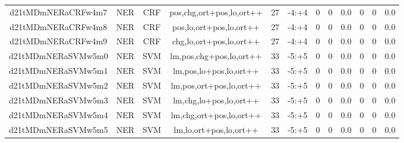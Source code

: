 \documentclass[a4paper]{article}
\begin{document}
\begin{landscape}
\begin{center}
\begin{tabular}{ |c|c|c|c|c|c|c|c|c|c|c|c|}
 
 	
 	\small{ d21tMDmNERaCRFw4m7 } & \small{ NER} & \small{  CRF }  & pos,chg,ort+pos,lo,ort++  &  27 &  \small{  -4:+4 }  &  0 & 0 & 0.0  &  0 & 0 & 0.0 \\
 	

 
 	
 	\small{ d21tMDmNERaCRFw4m8 } & \small{ NER} & \small{  CRF }  & pos,lo,ort+pos,lo,ort++  &  27 &  \small{  -4:+4 }  &  0 & 0 & 0.0  &  0 & 0 & 0.0 \\
 	

 
 	
 	\small{ d21tMDmNERaCRFw4m9 } & \small{ NER} & \small{  CRF }  & chg,lo,ort+pos,lo,ort++  &  27 &  \small{  -4:+4 }  &  0 & 0 & 0.0  &  0 & 0 & 0.0 \\
 	

 
 	
 	\small{ d21tMDmNERaSVMw5m0 } & \small{ NER} & \small{  SVM }  & lm,pos,chg+pos,lo,ort++  &  33 &  \small{  -5:+5 }  &  0 & 0 & 0.0  &  0 & 0 & 0.0 \\
 	

 
 	
 	\small{ d21tMDmNERaSVMw5m1 } & \small{ NER} & \small{  SVM }  & lm,pos,lo+pos,lo,ort++  &  33 &  \small{  -5:+5 }  &  0 & 0 & 0.0  &  0 & 0 & 0.0 \\
 	

 
 	
 	\small{ d21tMDmNERaSVMw5m2 } & \small{ NER} & \small{  SVM }  & lm,pos,ort+pos,lo,ort++  &  33 &  \small{  -5:+5 }  &  0 & 0 & 0.0  &  0 & 0 & 0.0 \\
 	

 
 	
 	\small{ d21tMDmNERaSVMw5m3 } & \small{ NER} & \small{  SVM }  & lm,chg,lo+pos,lo,ort++  &  33 &  \small{  -5:+5 }  &  0 & 0 & 0.0  &  0 & 0 & 0.0 \\
 	

 
 	
 	\small{ d21tMDmNERaSVMw5m4 } & \small{ NER} & \small{  SVM }  & lm,chg,ort+pos,lo,ort++  &  33 &  \small{  -5:+5 }  &  0 & 0 & 0.0  &  0 & 0 & 0.0 \\
 	

 
 	
 	\small{ d21tMDmNERaSVMw5m5 } & \small{ NER} & \small{  SVM }  & lm,lo,ort+pos,lo,ort++  &  33 &  \small{  -5:+5 }  &  0 & 0 & 0.0  &  0 & 0 & 0.0 \\
 	
 \hline
\end{tabular}
\end{center}





\end{landscape}
\end{document}
